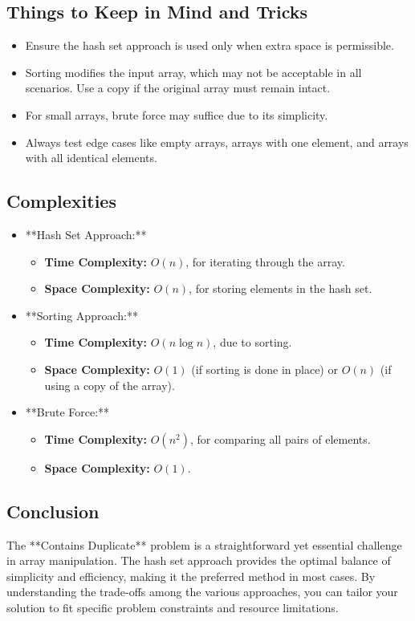 \subsection*{Things to Keep in Mind and Tricks}
\begin{itemize}
    \item Ensure the hash set approach is used only when extra space is permissible.
    \item Sorting modifies the input array, which may not be acceptable in all scenarios. Use a copy if the original array must remain intact.
    \item For small arrays, brute force may suffice due to its simplicity.
    \item Always test edge cases like empty arrays, arrays with one element, and arrays with all identical elements.
\end{itemize}

\subsection*{Complexities}
\begin{itemize}
    \item **Hash Set Approach:**
        \begin{itemize}
            \item \textbf{Time Complexity:} \(O(n)\), for iterating through the array.
            \item \textbf{Space Complexity:} \(O(n)\), for storing elements in the hash set.
        \end{itemize}
    \item **Sorting Approach:**
        \begin{itemize}
            \item \textbf{Time Complexity:} \(O(n \log n)\), due to sorting.
            \item \textbf{Space Complexity:} \(O(1)\) (if sorting is done in place) or \(O(n)\) (if using a copy of the array).
        \end{itemize}
    \item **Brute Force:**
        \begin{itemize}
            \item \textbf{Time Complexity:} \(O(n^2)\), for comparing all pairs of elements.
            \item \textbf{Space Complexity:} \(O(1)\).
        \end{itemize}
\end{itemize}

\subsection*{Conclusion}
The **Contains Duplicate** problem is a straightforward yet essential challenge in array manipulation. The hash set approach provides the optimal balance of simplicity and efficiency, making it the preferred method in most cases. By understanding the trade-offs among the various approaches, you can tailor your solution to fit specific problem constraints and resource limitations.